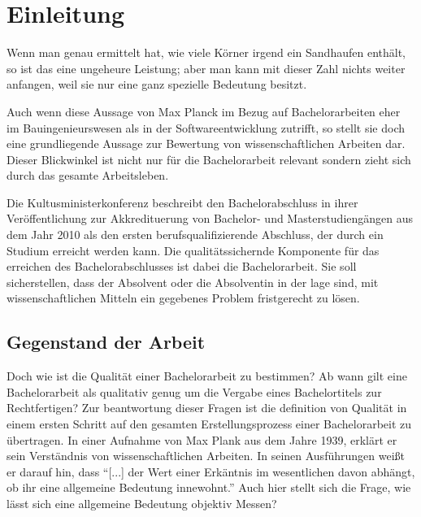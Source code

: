 
\chapter{Einleitung}
\begin{displayquote}
    Wenn man genau ermittelt hat, wie viele Körner irgend ein Sandhaufen enthält, so ist das eine ungeheure Leistung; aber man kann mit dieser Zahl nichts weiter anfangen, weil sie nur eine ganz spezielle Bedeutung besitzt.
\end{displayquote}

Auch wenn diese Aussage von Max Planck im Bezug auf Bachelorarbeiten eher im Bauingenieurswesen als in der Softwareentwicklung zutrifft, so stellt sie doch eine grundliegende Aussage zur Bewertung von wissenschaftlichen Arbeiten dar. Dieser Blickwinkel ist nicht nur für die Bachelorarbeit relevant sondern zieht sich durch das gesamte Arbeitsleben. 

Die Kultusministerkonferenz beschreibt den Bachelorabschluss in ihrer Veröffentlichung zur Akkredituerung von Bachelor- und Masterstudiengängen aus dem Jahr 2010 als den ersten berufsqualifizierende Abschluss, der durch ein Studium erreicht werden kann. Die qualitätssichernde Komponente für das erreichen des Bachelorabschlusses ist dabei die Bachelorarbeit. Sie soll sicherstellen, dass der Absolvent oder die Absolventin in der lage sind, mit wissenschaftlichen Mitteln ein gegebenes Problem fristgerecht zu lösen.\cite[Vgl.][S.4]{kmk:2010}



\section{Gegenstand der Arbeit}
Doch wie ist die Qualität einer Bachelorarbeit zu bestimmen? Ab wann gilt eine Bachelorarbeit als qualitativ genug um die Vergabe eines Bachelortitels zur Rechtfertigen? Zur beantwortung dieser Fragen ist die definition von Qualität in einem ersten Schritt auf den gesamten Erstellungsprozess einer Bachelorarbeit zu übertragen. 
In einer Aufnahme von Max Plank aus dem Jahre 1939, erklärt er sein Verständnis von wissenschaftlichen Arbeiten. In seinen Ausführungen weißt er darauf hin, dass \enquote{[...] der Wert einer Erkäntnis im wesentlichen davon abhängt, ob ihr eine allgemeine Bedeutung innewohnt.}\cite{Herneck:1976}
Auch hier stellt sich die Frage, wie lässt sich eine allgemeine Bedeutung objektiv Messen? 

